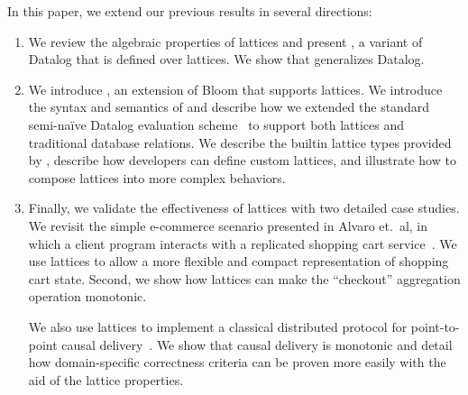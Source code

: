 In this paper, we extend our previous results in several directions:
\begin{enumerate}
\item
  We review the algebraic properties of lattices and present \baselang, a
  variant of Datalog that is defined over lattices. We show that \baselang
  generalizes Datalog.

\item
  We introduce \lang, an extension of Bloom that supports lattices. We introduce
  the syntax and semantics of \lang and describe how we extended the standard
  semi-na\"{i}ve Datalog evaluation scheme~\cite{Balbin1987} to support both
  lattices and traditional database relations. We describe the builtin lattice
  types provided by \lang, describe how developers can define custom lattices,
  and illustrate how to compose lattices into more complex behaviors.

\item
  Finally, we validate the effectiveness of lattices with two detailed case
  studies. We revisit the simple e-commerce scenario presented in Alvaro et.\
  al, in which a client program interacts with a replicated shopping cart
  service~\cite{Alvaro2011}. We use lattices to allow a more flexible and
  compact representation of shopping cart state. Second, we show how lattices
  can make the ``checkout'' aggregation operation monotonic.

  We also use lattices to implement a classical distributed protocol for
  point-to-point causal delivery~\cite{Schiper1989}. We show that causal
  delivery is monotonic and detail how domain-specific correctness criteria can
  be proven more easily with the aid of the lattice properties.
\end{enumerate}
